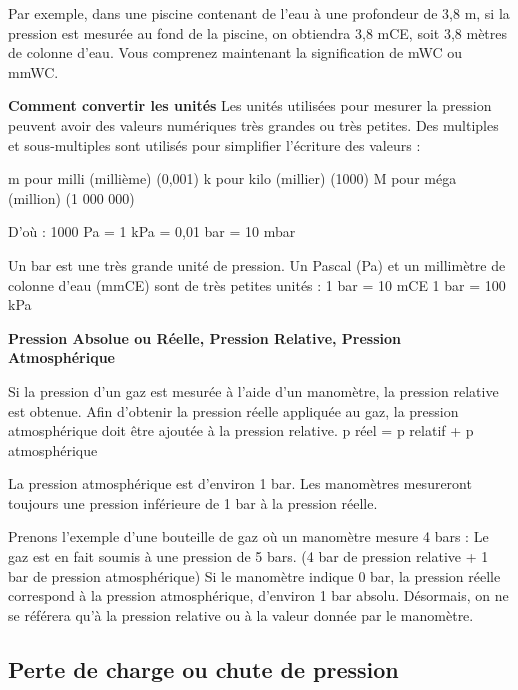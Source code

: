 \vspace{0.3cm}


Par exemple, dans une piscine contenant de l'eau à une profondeur de 3,8 m, si la pression est mesurée au fond de la piscine, on obtiendra 3,8 mCE, soit 3,8 mètres de colonne d'eau. Vous comprenez maintenant la signification de mWC ou mmWC.

\vspace{1cm}

\textbf{Comment convertir les unités}
Les unités utilisées pour mesurer la pression peuvent avoir des valeurs numériques très grandes ou très petites. Des multiples et sous-multiples sont utilisés pour simplifier l'écriture des valeurs :

m pour milli (millième) (0,001)
k pour kilo (millier) (1000)
M pour méga (million) (1 000 000)


D'où :
1000 Pa = 1 kPa = 0,01 bar = 10 mbar

Un bar est une très grande unité de pression. 
Un Pascal (Pa) et un millimètre de colonne d'eau (mmCE) sont de très petites unités :
1 bar = 10 mCE
1 bar = 100 kPa

\vspace{0.3cm}
\textbf{Pression Absolue ou Réelle, Pression Relative, Pression Atmosphérique}
\vspace{0.3cm}


Si la pression d'un gaz est mesurée à l'aide d'un manomètre, la pression relative est obtenue. 
Afin d'obtenir la pression réelle appliquée au gaz, la pression atmosphérique doit être ajoutée à la pression relative.
\vspace{0.3cm}
p réel = p relatif + p atmosphérique


\vspace{0.3cm}
La pression atmosphérique est d'environ 1 bar. Les manomètres mesureront toujours une pression inférieure de 1 bar à la pression réelle.

Prenons l'exemple d'une bouteille de gaz où un manomètre mesure 4 bars :
\vspace{0.3cm}
Le gaz est en fait soumis à une pression de 5 bars.
(4 bar de pression relative + 1 bar de pression atmosphérique)
\vspace{0.3cm}
Si le manomètre indique 0 bar, la pression réelle correspond à la pression atmosphérique, d'environ 1 bar absolu.
Désormais, on ne se référera qu'à la pression relative ou à la valeur donnée par le manomètre.




\subsection{Perte de charge ou chute de pression}

